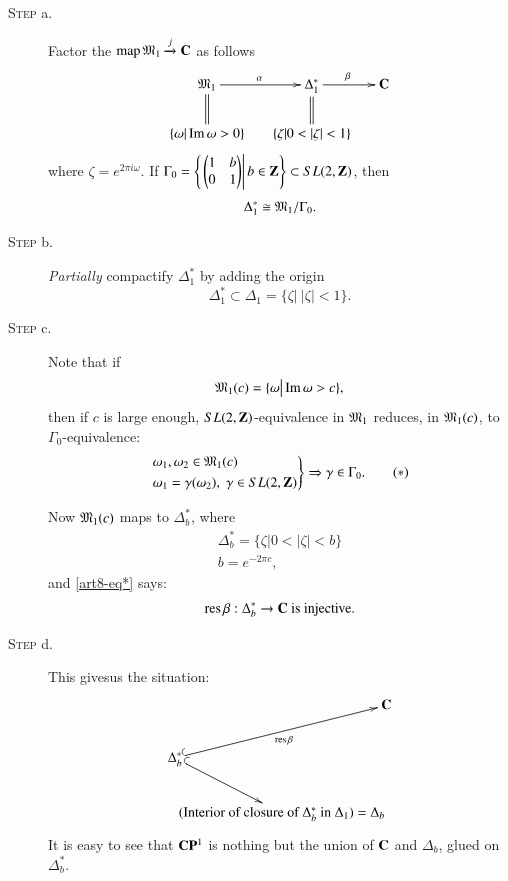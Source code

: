 \begin{description}
\item[\textsc{Step} a.] Factor the $\operatorname{map} \mathfrak{M}_1 \xrightarrow{j} \mathbf{C}$ as follows
$$ 
\xymatrix@R=0.7cm@C=0.5cm{
\fM_1 \ar@{=}[d] \ar[r]^{\alpha} & \Delta^\ast_1 \ar@{=}[d] \ar[r]^{\beta}& \bC\\
\{\omega | \Iim \omega > 0 \} & \{\zeta | 0 < |\zeta| < 1 \} & 
}
$$
where $\zeta = e^{2\pi i \omega}$. If $\Gamma_0 = \left\{ \left.\begin{pmatrix}1&b\\0 & 1\end{pmatrix} \right| b \in \mathbf{Z} \right\}  \subset S L (2, \mathbf{Z})$, then
$$
\Delta^\ast_1 \cong \mathfrak{M}_1 / \Gamma_0.
$$

\item[\textsc{Step} b.] \textit{Partially} compactify $\Delta^\ast_1$ by adding the origin
$$
\Delta^\ast_1 \subset \Delta_1 = \{\zeta \big|~ |\zeta| < 1\}. 
$$

\item[\textsc{Step} c.] Note that if 
$$
\mathfrak{M}_1 (c) = \{\omega \big| \operatorname{Im} \omega > c\},
$$
then if $c$ is large enough, $SL(2, \mathbf{Z})$-equivalence in $\mathfrak{M}_1$ reduces, in $\mathfrak{M}_1(c)$, to $\Gamma_0$-equivalence:
\begin{equation*}
\left.
\begin{aligned}
&\omega_1, \omega_2 \in \mathfrak{M}_1 (c) \\
&\omega_1 = \gamma (\omega_2), \; \gamma \in S L (2 , \mathbf{Z})
\end{aligned}
\right\} 
\Rightarrow \gamma \in \Gamma_0.
\tag{$\ast$}\label{art8-eq*}
\end{equation*}

Now $\mathfrak{M}_1 (c)$ maps to $\Delta^\ast_b$, where 
\begin{gather*}
\Delta^\ast_b = \{\zeta \big| 0< |\zeta| < b\}\\
b = e^{-2 \pi c},
\end{gather*}
and \eqref{art8-eq*} says:
$$
\operatorname{res} \beta : \Delta^\ast_b \to \mathbf{C} \text{ is injective.}
$$

\item[\textsc{Step} d.] This gives\pageoriginale us the situation:
$$
\xymatrix@R=0.3cm@C=-0.3cm{
& &  \bC\\
&&&\\
\Delta^\ast_b \ar@{^{(}->}[uurr]_{\res \beta} \ar@{^{(}->}[ddr]& & \\
& & & \\
& (\text{Interior of closure of $\Delta^\ast_b$ in  $\Delta_1$}) = \Delta_b &
}
$$
It is easy to see that $\mathbf{C}\mathbf{P}^1$ is nothing but the union of $\mathbf{C}$ and $\Delta_b$, glued on $\Delta^\ast_b$.
\end{description}


